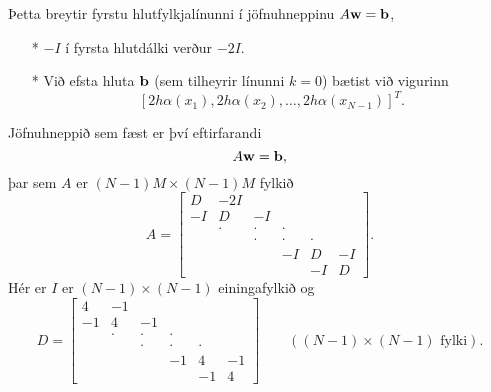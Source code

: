 \documentclass[icelandic,a4paper,12pt]{article}
\begin{document}
 Þetta breytir fyrstu hlutfylkjalínunni í jöfnuhneppinu $A\mbox{${\bf w}$} = \mbox{${\bf b}$}$, \pause
 \begin{itemize}
  \item[{\color{red} *}] $-I$ í fyrsta hlutdálki verður $-2I$.\pause
  \item[{\color{blue} *}] Við efsta hluta $\mbox{${\bf b}$}$ (sem tilheyrir línunni $k=0$)
  bætist við vigurinn 
  $$
    [2h\alpha(x_1),2h\alpha(x_2),\ldots,2h\alpha(x_{N-1})]^T.
   $$
 \end{itemize}




Jöfnuhneppið sem fæst er því eftirfarandi
$$
A\mbox{${\bf w}$} = \mbox{${\bf b}$},
$$ 
þar sem $A$ er $(N-1)M\times (N-1)M$ fylkið
$$
  A = \left[\begin{array}{cccccc}
D & -2I &   &   &   &  \\
-I & D & -I &   &   &  \\
  & \cdot & \cdot & \cdot &   &  \\
  &   & \cdot & \cdot & \cdot &  \\
  &   &  & -I & D & -I\\
  &   &   &   & -I & D
      \end{array}\right].
$$
Hér er $I$ er $(N-1)\times (N-1)$ einingafylkið og 
$$
  D = \left[\begin{array}{cccccc}
4 & -1 &   &   &   &  \\
-1 & 4 & -1 &   &   &  \\
  & \cdot & \cdot & \cdot &   &  \\
  &   & \cdot & \cdot & \cdot &  \\
  &   &  & -1 & 4 & -1\\
  &   &   &   & -1 & 4
      \end{array}\right] \qquad ((N-1)\times (N-1) \text{ fylki}).
$$



{\  }
\end{document}
